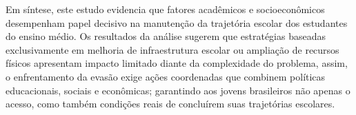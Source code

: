 \documentclass[english, spanish, brazilian]{RBIEarticle} %
\begin{document}
Em síntese, este estudo evidencia que fatores acadêmicos e socioeconômicos desempenham papel decisivo na manutenção da trajetória escolar dos estudantes do ensino médio. Os resultados da análise sugerem que estratégias baseadas exclusivamente em melhoria de infraestrutura escolar ou ampliação de recursos físicos apresentam impacto limitado diante da complexidade do problema, assim, o enfrentamento da evasão exige ações coordenadas que combinem políticas educacionais, sociais e econômicas; garantindo aos jovens brasileiros não apenas o acesso, como também condições reais de concluírem suas trajetórias escolares.























\pagebreak
\pagebreak
\end{document}
